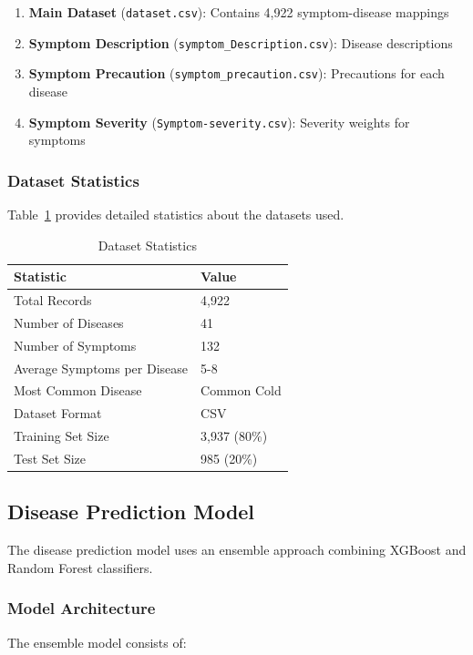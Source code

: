 \documentclass[12pt,a4paper]{article}
\begin{document}
\begin{enumerate}
    \item \textbf{Main Dataset} (\texttt{dataset.csv}): Contains 4,922 symptom-disease mappings
    \item \textbf{Symptom Description} (\texttt{symptom\_Description.csv}): Disease descriptions
    \item \textbf{Symptom Precaution} (\texttt{symptom\_precaution.csv}): Precautions for each disease
    \item \textbf{Symptom Severity} (\texttt{Symptom-severity.csv}): Severity weights for symptoms
\end{enumerate}

\subsubsection{Dataset Statistics}
Table~\ref{tab:dataset} provides detailed statistics about the datasets used.

\begin{table}[H]
\centering
\caption{Dataset Statistics}
\label{tab:dataset}
\begin{tabularx}{0.6\textwidth}{|l|X|}
\hline
\textbf{Statistic} & \textbf{Value} \\
\hline
Total Records & 4,922 \\
\hline
Number of Diseases & 41 \\
\hline
Number of Symptoms & 132 \\
\hline
Average Symptoms per Disease & 5-8 \\
\hline
Most Common Disease & Common Cold \\
\hline
Dataset Format & CSV \\
\hline
Training Set Size & 3,937 (80\%) \\
\hline
Test Set Size & 985 (20\%) \\
\hline
\end{tabularx}
\end{table}

\subsection{Disease Prediction Model}
The disease prediction model uses an ensemble approach combining XGBoost and Random Forest classifiers.

\subsubsection{Model Architecture}
The ensemble model consists of:
\end{document}
